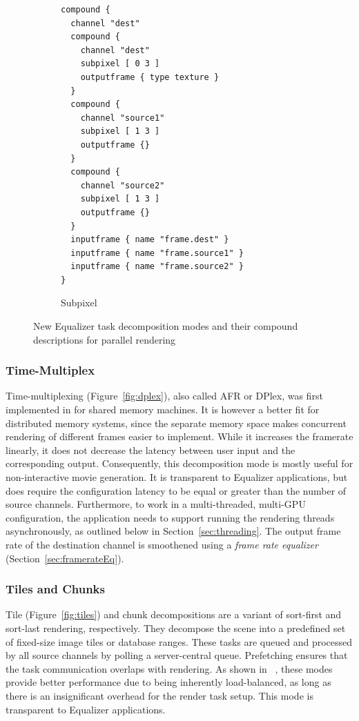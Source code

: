 \documentclass[10pt,journal,compsoc]{IEEEtran}
\newcommand{\sref}[1]{Section~\ref{#1}}
\newcommand{\fig}[1]{Figure~\ref{#1}}
\begin{document}
\begin{figure}[ht]
\begin{subfigure}[t]{0.24\textwidth}
{\begin{lstlisting}
compound {
  channel "dest"
  compound {
    channel "dest"
    subpixel [ 0 3 ]
    outputframe { type texture }
  }
  compound {
    channel "source1"
    subpixel [ 1 3 ]
    outputframe {}
  }
  compound {
    channel "source2"
    subpixel [ 1 3 ]
    outputframe {}
  }
  inputframe { name "frame.dest" }
  inputframe { name "frame.source1" }
  inputframe { name "frame.source2" }
}
    \end{lstlisting}\vspace{21ex}}
    \caption{\label{fig:subpixel}Subpixel}
  \end{subfigure}
  \caption{New Equalizer task decomposition modes and their compound descriptions for parallel rendering}
  \label{fig:compounds}
\end{figure}


\subsubsection{Time-Multiplex}

Time-multiplexing (\fig{fig:dplex}), also called AFR or DPlex, was first
implemented in \cite{BRE:05} for shared memory machines. It is however a better
fit for distributed memory systems, since the separate memory space makes
concurrent rendering of different frames easier to implement. While it increases
the framerate linearly, it does not decrease the latency between user input and
the corresponding output. Consequently, this decomposition mode is mostly useful
for non-interactive movie generation. It is transparent to Equalizer
applications, but does require the configuration latency to be equal or greater
than the number of source channels. Furthermore, to work in a multi-threaded,
multi-GPU configuration, the application needs to support running the rendering
threads asynchronously, as outlined below in \sref{sec:threading}. The output frame
rate of the destination channel is smoothened using a {\em frame rate equalizer}
(\sref{sec:framerateEq}).

\subsubsection{Tiles and Chunks}\label{sec:tile}

Tile (\fig{fig:tiles}) and chunk decompositions are a variant of sort-first and
sort-last rendering, respectively. They decompose the scene into a predefined
set of fixed-size image tiles or database ranges. These tasks are queued and
processed by all source channels by polling a server-central queue. Prefetching
ensures that the task communication overlaps with rendering. As shown in~
\cite{SPEP:16}, these modes provide better performance due to being inherently
load-balanced, as long as there is an insignificant overhead for the render task
setup. This mode is transparent to Equalizer applications.
\end{document}
